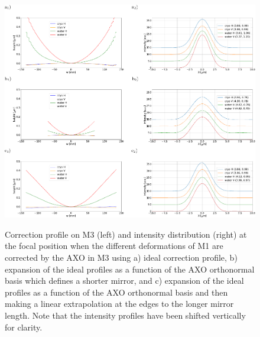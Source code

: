 \documentclass{iucr}
\newcommand{\inblue}[1]{{\color{blue}#1}}
\begin{document}
   \begin{figure}
   \label{fig:intensitycorrected} 
   \includegraphics[width=1.0\textwidth]{figures/fig4.pdf}\\
   \caption
   { Correction profile on M3 (left) and intensity distribution (right) at the focal position when the different deformations of M1 are corrected by the AXO in M3 using  a) ideal correction profile, b) expansion of the ideal profiles as a function of the AXO orthonormal basis which defines a shorter mirror, and c) \inblue{expansion of the ideal profiles as a function of the AXO orthonormal basis and then making a linear extrapolation at the edges to the longer mirror length}. Note that the intensity profiles have been shifted vertically for clarity. }
   \end{figure} 
\end{document}
